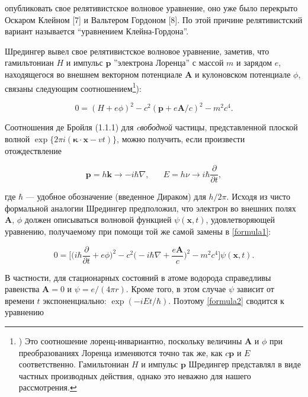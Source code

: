\documentclass[a5paper,10pt]{article}
\begin{document}
\pagestyle{fancy}
\noindent опубликовать свое релятивистское волновое уравнение, оно уже было перекрыто Оскаром Клейном [7] и Вальтером Гордоном [8].  По этой причине релятивистский вариант называется ``уравнением Клейна-Гордона''.

Шредингер вывел свое релятивистское волновое уравнение, заметив, что гамильтониан $H$ и импульс $\mathbf{p}$ ''электрона Лоренца'' с массой $m$ и зарядом $e$, находящегося во внешнем векторном потенциале $\mathbf{A}$ и кулоновском потенциале $\phi$, связаны следующим соотношением\footnote{) Это соотношение лоренц-инвариантно, поскольку величины $\mathbf{A}$ и $\phi$ при преобразованиях Лоренца изменяются точно так же, как $c\mathbf{p}$ и $E$ соответственно. Гамильтониан $H$ и импульс $\mathbf{p}$ Шредингер представлял в виде частных производных действия, однако это неважно для нашего рассмотрения.}):

\begin{equation}
\label{formula1}
\tag{1.1.2}
0 = (H+e\phi )^2-c^2(\mathbf{p} +e\mathbf{A} /c)^2-m^2c^4.
\end{equation}

\noindent Соотношения де Бройля (1.1.1) для \textit{cвободной} частицы, представленной плоской волной $\exp \{ 2 \pi i( \boldsymbol {\kappa} \cdot \mathbf{x} -vt) \} $, можно получить, если произвести отождествление

\begin{equation}
\tag{1.1.3}
\mathbf{p} = h\mathbf{k}\rightarrow -i\hbar\nabla,\;\;\;\;\;\; E=h\nu \rightarrow i\hbar \frac{\partial}{\partial t},
\end{equation}

\noindent где $\hbar$ — удобное обозначение (введенное Дираком) для $h/2 \pi$. Исходя из чисто формальной аналогии Шредингер предположил, что электрон во внешних полях $\mathbf{A}$, $\phi$ должен описываться волновой функцией $\psi(\mathbf{x},t)$, удовлетворяющей уравнению, получаемому при помощи той же самой замены в \eqref{formula1}:

\begin{equation}
\label{formula2} 
\tag{1.1.4}
0 = \biggl[\biggl(i\hbar \frac{\partial}{\partial t}+e\phi \biggr)^2 - c^2\biggl(-i\hbar \nabla +\frac{e \mathbf{A}}{c}\biggr)^2-m^2c^4\biggr]\psi (\mathbf {x},t).
\end{equation}

\noindent В частности, для стационарных состояний в атоме водорода справедливы равенства $\mathbf{A} = 0$ и $\psi = e/(4\pi r)$. Кроме того, в этом случае $\psi$ зависит от времени $t$ экспоненциально: $\exp(-iEt/\hbar)$. Поэтому \eqref{formula2} сводится к уравнению
\end{document}
